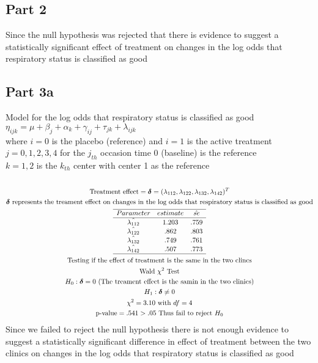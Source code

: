 \documentclass{article}
\begin{document}
\begin{flushleft}
\subsection*{Part 2}
Since the null hypothesis was rejected that there is evidence to suggest a statistically significant effect of treatment on changes in the log odds that respiratory status is classified as good
\subsection*{Part 3a}
Model for the log odds that respiratory status is classified as good\\
$\eta_{ijk}=\mu+\beta_j+\alpha_k+\gamma_{ij}+\tau_{jk}+\lambda_{ijk}$\\
where $i=0$ is the placebo (reference) and $i=1$ is the active treatment\\
$j=0,1,2,3,4$ for the $j_{th}$ occasion time 0 (baseline) is the reference \\
$k=1,2$ is the $k_{th}$ center with center 1 as the reference\\
\begin{multline*}\\
\text{Treatment effect}=\boldsymbol{\delta}=(\lambda_{112},\lambda_{122},\lambda_{132},\lambda_{142})^T\\
\boldsymbol{\delta} \text{ represents the treament effect on changes in the log odds that respiratory status is classified as good}\\
\begin{array}{ccc}
\hline
Parameter & estimate & \hat{se}\\
\hline
\hat{\lambda_{112}}&1.203&.759\\
\hat{\lambda_{122}}&.862&.803\\
\hat{\lambda_{132}}&.749&.761\\
\hat{\lambda_{142}}&.507&.773\\
\hline
\end{array}\\
\text{Testing if the effect of treatment is the same in the two clincs}\\
\text{Wald } \chi^2 \text{ Test}\\
H_0: \boldsymbol{\delta}=0 \text{ (The treament effect is the samin in the two clinics)}\\
H_1: \boldsymbol{\delta}\neq 0\\
\chi^2=3.10 \text{ with } df=4\\
\text{p-value}=.541>.05 \text{ Thus fail to reject } H_0\\
\end{multline*}
Since we failed to reject the null hypothesis there is not enough evidence to suggest a statistically significant difference in  effect of treatment between the two clinics on changes in the log odds that respiratory status is classified as good

\end{flushleft}
\end{document}
